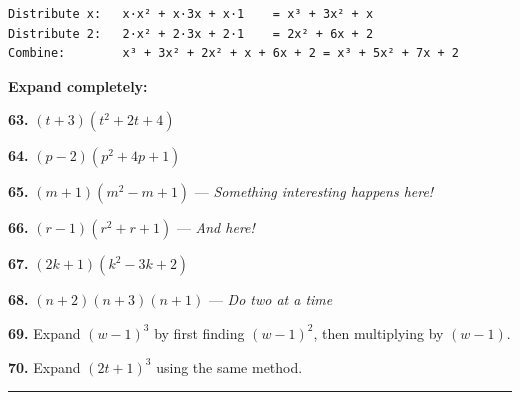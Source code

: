 \documentclass[
  11pt,
]{article}
\begin{document}
\begin{verbatim}
Distribute x:   x·x² + x·3x + x·1    = x³ + 3x² + x
Distribute 2:   2·x² + 2·3x + 2·1    = 2x² + 6x + 2
Combine:        x³ + 3x² + 2x² + x + 6x + 2 = x³ + 5x² + 7x + 2
\end{verbatim}

\textbf{Expand completely:}

\textbf{63.} \((t + 3)(t^2 + 2t + 4)\)

\textbf{64.} \((p - 2)(p^2 + 4p + 1)\)

\textbf{65.} \((m + 1)(m^2 - m + 1)\) --- \emph{Something interesting
happens here!}

\textbf{66.} \((r - 1)(r^2 + r + 1)\) --- \emph{And here!}

\textbf{67.} \((2k + 1)(k^2 - 3k + 2)\)

\textbf{68.} \((n + 2)(n + 3)(n + 1)\) --- \emph{Do two at a time}

\textbf{69.} Expand \((w - 1)^3\) by first finding \((w - 1)^2\), then
multiplying by \((w - 1)\).

\textbf{70.} Expand \((2t + 1)^3\) using the same method.

\begin{center}\rule{0.5\linewidth}{0.5pt}\end{center}
\end{document}
